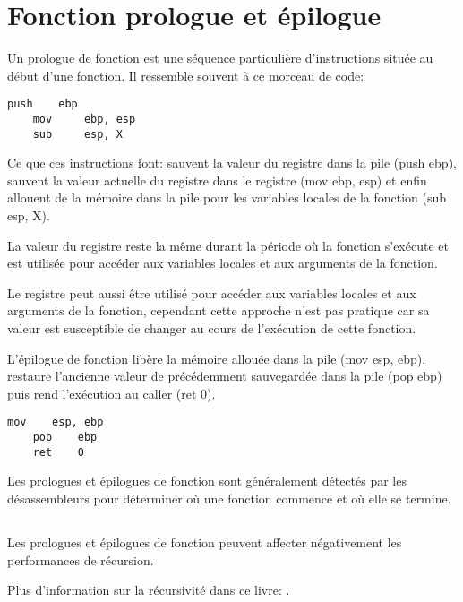 \section{Fonction prologue et épilogue}
\label{sec:prologepilog}

Un prologue de fonction est une séquence particulière d'instructions située au début d'une fonction. Il ressemble souvent à ce morceau de code:

\begin{lstlisting}[style=customasmx86]
    push    ebp
    mov     ebp, esp
    sub     esp, X
\end{lstlisting}

Ce que ces instructions font: sauvent la valeur du registre \EBP dans la pile (push ebp), sauvent la valeur actuelle du registre \ESP dans le
 registre \EBP (mov ebp, esp) et enfin allouent de la mémoire dans la pile pour les variables locales de la fonction (sub esp, X).

La valeur du registre \EBP reste la même durant la période où la fonction s'exécute et est utilisée pour accéder aux variables locales et aux arguments de la fonction.

Le registre \ESP peut aussi être utilisé pour accéder aux variables locales et aux arguments de la fonction, cependant cette approche n'est
 pas pratique car sa valeur est susceptible de changer au cours de l'exécution de cette fonction.

L'épilogue de fonction libère la mémoire allouée dans la pile (mov esp, ebp), restaure l'ancienne valeur de \EBP précédemment sauvegardée dans la pile (pop ebp) puis rend l'exécution au \gls{caller} (ret 0).

\begin{lstlisting}[style=customasmx86]
    mov    esp, ebp
    pop    ebp
    ret    0
\end{lstlisting}

Les prologues et épilogues de fonction sont généralement détectés par les désassembleurs pour déterminer où une fonction commence et où elle se termine.

\subsection{\Recursion}

\myindex{\Recursion}
Les prologues et épilogues de fonction peuvent affecter négativement les performances de récursion.

Plus d'information sur la récursivité dans ce livre: .
